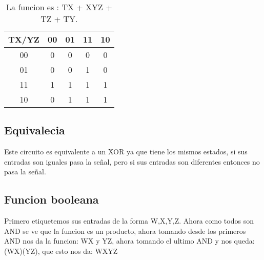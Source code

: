 \documentclass{article}
\begin{document}
\begin{table}[H]
  \centering
    \begin{tabular}{| c | c | c | c | c |}
      \hline \cellcolor{gray!25}TX/YZ & \cellcolor{gray!25}00 & \cellcolor{gray!25}01 & \cellcolor{gray!25}11 & \cellcolor{gray!25}10 \\ \hline
      \cellcolor{gray!25}00 & 0 & 0 & 0 & 0\\ \hline
      \cellcolor{gray!25}01 & 0 & 0 & \cellcolor{blue!25}1 & 0\\ \hline
      \cellcolor{gray!25}11 & \cellcolor{blue!25}1 & \cellcolor{blue!25}1 & \cellcolor{blue!25}1 & \cellcolor{blue!25}1\\ \hline
      \cellcolor{gray!25}10 & 0 & \cellcolor{blue!25}1 & \cellcolor{blue!25}1 & \cellcolor{blue!25}1\\ \hline
    \end{tabular}
  \caption{La funcion es : TX + XYZ + TZ + TY.}
\end{table}

\subsection{Equivalecia}

Este circuito es equivalente a un XOR ya que tiene los mismos estados, si sus entradas son iguales pasa la señal, pero si sus entradas son diferentes entonces no pasa la señal.

\subsection{Funcion booleana}

Primero etiquetemos sus entradas de la forma W,X,Y,Z. Ahora como todos son AND se ve que la funcion es un producto, ahora tomando desde los primeros AND nos da la funcion: WX y YZ, ahora tomando el ultimo AND y nos queda: (WX)(YZ), que esto nos da: WXYZ
\end{document}
